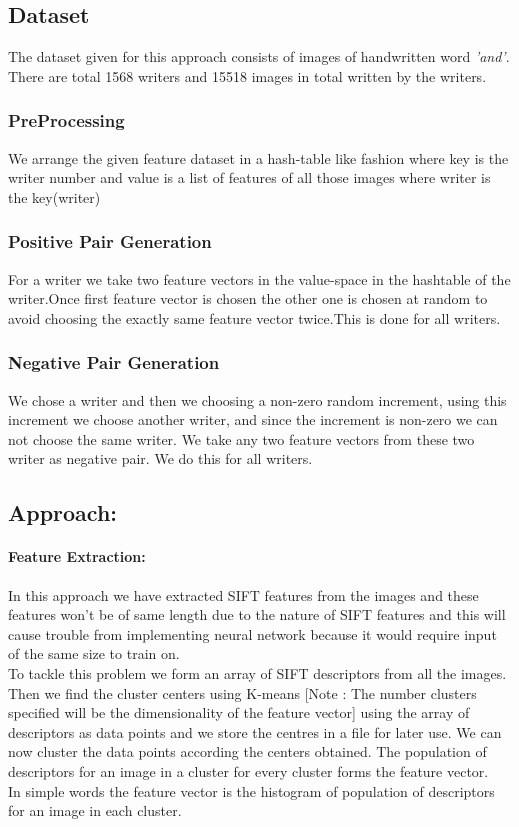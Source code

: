 \documentclass{article}
\begin{document}
\subsection{Dataset}
The dataset given for this approach consists of images of handwritten word \textit{'and'}. There are total 1568 writers and 15518 images in total written by the writers. 
 \subsubsection{PreProcessing}
        We arrange the given feature dataset in a hash-table like fashion where key is the writer number and value is a list of features of all those images where writer is the key(writer) 
    \subsubsection{Positive Pair Generation}
        For a writer we take two feature vectors in the value-space in the hashtable of the writer.Once first feature vector is chosen the other one is chosen at random to avoid choosing the exactly same feature vector twice.This is done for all writers.
    \subsubsection{Negative Pair Generation}
        We chose a writer and then we choosing a non-zero random increment, using this increment we choose another writer, and since the increment is non-zero we can not choose the same writer. We take any two feature vectors from these two writer as negative pair. We do this for all writers.
\subsection{Approach:}

\paragraph{Feature Extraction:\\}In this approach we have extracted SIFT features from the images and these features won't be of same length due to the nature of SIFT features and this will cause trouble from implementing neural network because it would require input of the same size to train on.\\ To tackle this problem we form an array of SIFT descriptors from all the images. Then we find the cluster centers using K-means [Note :  The number clusters specified will be the dimensionality of the feature vector] using the array of descriptors as data points and we store the centres in a file for later use. We can now cluster the data points according the centers obtained. The population of descriptors for an image in a cluster for every cluster forms the feature vector.\\
In simple words the feature vector is the histogram of population of descriptors for an image in each cluster.
\end{document}

